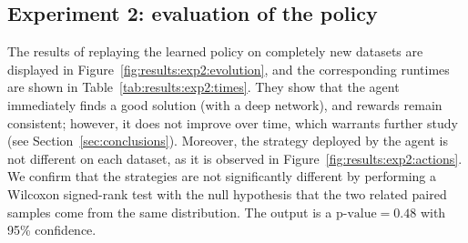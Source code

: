 

\subsection*{Experiment 2: evaluation of the policy}

The results of replaying the learned policy on completely new datasets are displayed in Figure~\ref{fig:results:exp2:evolution}, and the corresponding runtimes are shown in Table~\ref{tab:results:exp2:times}. They show that the agent immediately finds a good solution (with a deep network), and rewards remain consistent; however, it does not improve over time, which warrants further study (see Section~\ref{sec:conclusions}). Moreover, the strategy deployed by the agent is not different on each dataset, as it is observed in Figure~\ref{fig:results:exp2:actions}. We confirm that the strategies are not significantly different by performing a Wilcoxon signed-rank test with the null hypothesis that the two related paired samples come from the same distribution. The output is a $\text{p-value}=0.48$ with 95\% confidence.

